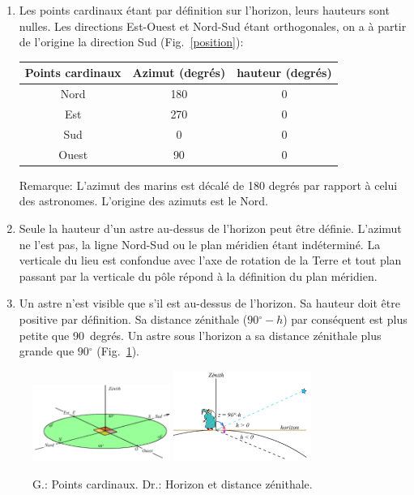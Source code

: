 \documentclass[a4paper,10pt]{report}
\renewcommand{\deg}{\ensuremath{^{\circ}}}
\begin{document}
\begin{Answer}
  \begin{enumerate}
  \item Les points cardinaux étant par définition sur l'horizon, leurs
    hauteurs sont nulles. Les directions Est-Ouest et Nord-Sud étant
    orthogonales, on a à partir de l'origine la direction Sud
    (Fig.~\ref{position}):
    \begin{center}
      \begin{tabular}{|c|c|c|}
        \hline
        Points cardinaux & Azimut (degrés) & hauteur (degrés) \\ \hline
        Nord & 180 & 0 \\ \hline
        Est & 270 & 0 \\ \hline
        Sud & 0 & 0 \\ \hline
        Ouest & 90 & 0 \\ \hline
      \end{tabular}
    \end{center}
    Remarque: L'azimut des marins est décalé de 180 degrés par rapport
    à celui des astronomes. L'origine des azimuts est le Nord.

  \item Seule la hauteur d'un astre au-dessus de l'horizon peut être
    définie. L'azimut ne l'est pas, la ligne Nord-Sud ou le plan
    méridien étant indéterminé. La verticale du lieu est confondue
    avec l'axe de rotation de la Terre et tout plan passant par la
    verticale du pôle répond à la définition du plan méridien.

  \item Un astre n'est visible que s'il est au-dessus de l'horizon. Sa
    hauteur doit être positive par définition. Sa distance zénithale
    ($90\deg - h$) par conséquent est plus petite que 90~degrés.  Un
    astre sous l'horizon a sa distance zénithale plus grande que
    $90\deg$ (Fig.~\ref{position2}).
  \end{enumerate}

  \begin{figure}[htp]
    \begin{center}
      \includegraphics[width=0.4\textwidth]{position}
      \includegraphics[width=0.4\textwidth]{position2}
    \end{center}
    \label{position}
    \label{position2}
    \caption{G.: Points cardinaux. Dr.: Horizon et distance zénithale.}
  \end{figure}
\end{Answer}
\end{document}
